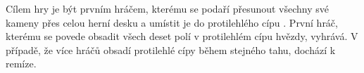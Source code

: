 Cílem hry je být prvním hráčem, kterému se podaří přesunout všechny své kameny přes celou herní desku a umístit je do protilehlého cípu \cite{pravidla}. První hráč, kterému se povede obsadit všech deset polí v protilehlém cípu hvězdy, vyhrává. V případě, že více hráčů obsadí protilehlé cípy během stejného tahu, dochází k remíze.

\begin{figure}
	\centering
	\hspace{3em} %
	\hspace{3em} %
\end{figure}
